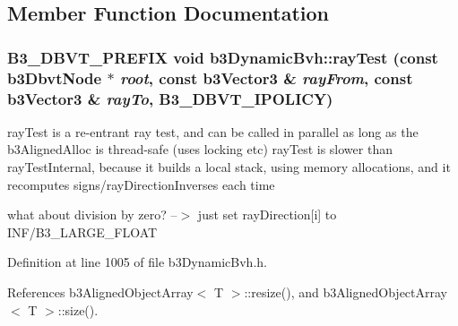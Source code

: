 \subsection{Member Function Documentation}
\hypertarget{structb3_dynamic_bvh_b913761020aef36751217a877fcf7e6d}{
\subsubsection[rayTest]{\setlength{\rightskip}{0pt plus 5cm}B3\_\-DBVT\_\-PREFIX void b3DynamicBvh::rayTest (const b3DbvtNode $\ast$ {\em root}, \/  const b3Vector3 \& {\em rayFrom}, \/  const b3Vector3 \& {\em rayTo}, \/  B3\_\-DBVT\_\-IPOLICY)}}
\label{structb3_dynamic_bvh_b913761020aef36751217a877fcf7e6d}


rayTest is a re-entrant ray test, and can be called in parallel as long as the b3AlignedAlloc is thread-safe (uses locking etc) rayTest is slower than rayTestInternal, because it builds a local stack, using memory allocations, and it recomputes signs/rayDirectionInverses each time 

what about division by zero? --$>$ just set rayDirection\mbox{[}i\mbox{]} to INF/B3\_\-LARGE\_\-FLOAT 

Definition at line 1005 of file b3DynamicBvh.h.

References b3AlignedObjectArray$<$ T $>$::resize(), and b3AlignedObjectArray$<$ T $>$::size().

